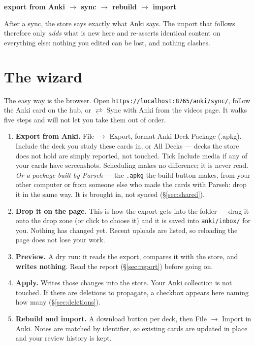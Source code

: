 \documentclass[11pt,oneside]{report}
\newcommand{\file}[1]{\texttt{#1}}
\newcommand{\menu}[1]{\textsf{#1}}
\begin{document}
\begin{center}
\textbf{export from Anki $\rightarrow$ sync $\rightarrow$ rebuild $\rightarrow$ import}
\end{center}

After a sync, the store says exactly what Anki says. The import that follows
therefore only \emph{adds} what is new here and re-asserts identical content
on everything else: nothing you edited can be lost, and nothing clashes.

\section{The wizard}

The easy way is the browser. Open \texttt{https://localhost:8765/anki/sync/},
follow the \menu{Anki} card on the hub, or \menu{\(\rightleftarrows\) Sync
with Anki} from the videos page. It walks five steps and will not let you take them out of order.

\begin{enumerate}
\item \textbf{Export from Anki.} \menu{File $\rightarrow$ Export}, format
  \menu{Anki Deck Package (.apkg)}. Include the deck you study these cards
  in, or \menu{All Decks} --- decks the store does not hold are simply
  reported, not touched. Tick \menu{Include media} if any of your cards have
  screenshots. Scheduling makes no difference; it is never read.
  \emph{Or a package built by Parseh} --- the \file{.apkg} the build button
  makes, from your other computer or from someone else who made the cards
  with Parseh: drop it in the same way. It is brought in, not synced
  (\S\ref{sec:shared}).

\item \textbf{Drop it on the page.} This is how the export gets into the
  folder --- drag it onto the drop zone (or click to choose it) and it is
  saved into \file{anki/inbox/} for you. Nothing has changed yet. Recent
  uploads are listed, so reloading the page does not lose your work.

\item \textbf{Preview.} A dry run: it reads the export, compares it with the
  store, and \textbf{writes nothing}. Read the report
  (\S\ref{sec:report}) before going on.

\item \textbf{Apply.} Writes those changes into the store. Your Anki
  collection is not touched. If there are deletions to propagate, a checkbox
  appears here naming how many (\S\ref{sec:deletions}).

\item \textbf{Rebuild and import.} A download button per deck, then
  \menu{File $\rightarrow$ Import} in Anki. Notes are matched by identifier,
  so existing cards are updated in place and your review history is kept.
\end{enumerate}
\end{document}
